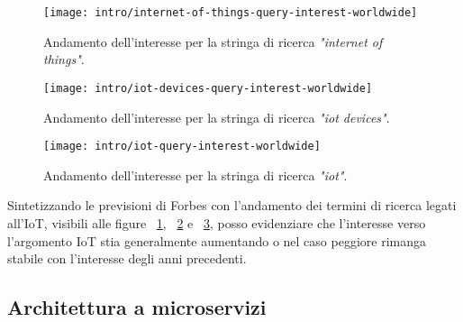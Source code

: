 \begin{figure}[H]
    \centering
    \texttt{[image: intro/internet-of-things-query-interest-worldwide]}
    \caption{Andamento dell'interesse per la stringa di ricerca \textit{"internet of things"}. \\ \cite{site:iot-long-trend}}
    \label{fig:internet-of-things-query-interest}
\end{figure}

\begin{figure}[H]
    \centering
    \texttt{[image: intro/iot-devices-query-interest-worldwide]}
    \caption{Andamento dell'interesse per la stringa di ricerca \textit{"iot devices"}. \\ \cite{site:iot-devices-trend}}
    \label{fig:iot-devices-query-interest}
\end{figure}

\begin{figure}[H]
    \centering
    \texttt{[image: intro/iot-query-interest-worldwide]}
    \caption{Andamento dell'interesse per la stringa di ricerca \textit{"iot"}. \\ \cite{site:iot-short-trend}}
    \label{fig:iot-query-interest}
\end{figure}

Sintetizzando le previsioni di Forbes con l'andamento dei termini di ricerca legati all'IoT, visibili alle figure ~\ref{fig:internet-of-things-query-interest}, ~\ref{fig:iot-devices-query-interest} e ~\ref{fig:iot-query-interest}, posso evidenziare che l'interesse verso l'argomento IoT stia generalmente aumentando o nel caso peggiore rimanga stabile con l'interesse degli anni precedenti.

\subsection{Architettura a microservizi}

